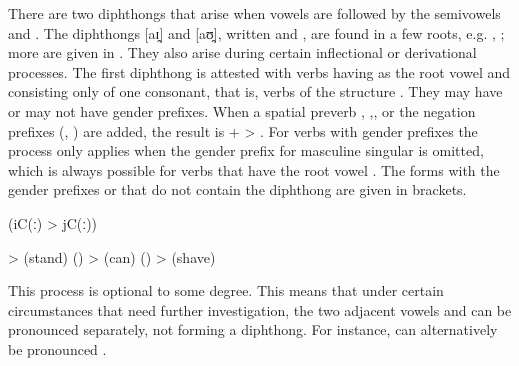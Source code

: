 There are two diphthongs that arise when vowels are followed by the semivowels  and . The diphthongs [aɪ̯] and [aʊ̯], written  and , are found in a few roots, e.g.  , \tab  {} ; more are given in . They also arise during certain inflectional or derivational processes. The first diphthong is attested with verbs having  as the root vowel and consisting only of one consonant, that is, verbs of the structure . They may have or may not have gender prefixes. When a spatial preverb , ,, or the negation prefixes (, ) are added, the result is  +  > . For verbs with gender prefixes the process only applies when the gender prefix  for masculine singular is omitted, which is always possible for verbs that have the root vowel . The forms with the gender prefixes  or  that do not contain the diphthong are given in brackets.
%
\begin{exe}
	 (iC(ː) > jC(ː))\label{ex:a i aj phon}
	\begin{xlist}
		\ex	{} >   (stand) ()
		\ex	{} >   (can) ()
		\ex	{} >   (shave)
	\end{xlist}
\end{exe}

This process is optional to some degree. This means that under certain circumstances that need further investigation, the two adjacent vowels  and  can be pronounced separately, not forming a diphthong. For instance,  can alternatively be pronounced  .

